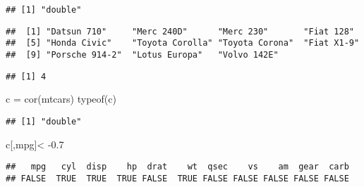 \documentclass[]{article}
\newenvironment{Shaded}{\begin{snugshade}}{\end{snugshade}}
\newcommand{\FloatTok}[1]{\textcolor[rgb]{0.00,0.00,0.81}{#1}}
\newcommand{\FunctionTok}[1]{\textcolor[rgb]{0.00,0.00,0.00}{#1}}
\newcommand{\NormalTok}[1]{#1}
\newcommand{\OtherTok}[1]{\textcolor[rgb]{0.56,0.35,0.01}{#1}}
\newcommand{\SpecialCharTok}[1]{\textcolor[rgb]{0.00,0.00,0.00}{#1}}
\newcommand{\StringTok}[1]{\textcolor[rgb]{0.31,0.60,0.02}{#1}}
\begin{document}
\begin{verbatim}
## [1] "double"
\end{verbatim}

\begin{Shaded}
\end{Shaded}

\begin{verbatim}
##  [1] "Datsun 710"     "Merc 240D"      "Merc 230"       "Fiat 128"      
##  [5] "Honda Civic"    "Toyota Corolla" "Toyota Corona"  "Fiat X1-9"     
##  [9] "Porsche 914-2"  "Lotus Europa"   "Volvo 142E"
\end{verbatim}

\begin{Shaded}
\end{Shaded}

\begin{verbatim}
## [1] 4
\end{verbatim}

\begin{Shaded}
\begin{Highlighting}[]
\NormalTok{c }\OtherTok{=} \FunctionTok{cor}\NormalTok{(mtcars)}
\FunctionTok{typeof}\NormalTok{(c)}
\end{Highlighting}
\end{Shaded}

\begin{verbatim}
## [1] "double"
\end{verbatim}

\begin{Shaded}
\begin{Highlighting}[]
\NormalTok{c[,}\StringTok{\textquotesingle{}mpg\textquotesingle{}}\NormalTok{]}\SpecialCharTok{\textless{}} \SpecialCharTok{{-}}\FloatTok{0.7}
\end{Highlighting}
\end{Shaded}

\begin{verbatim}
##   mpg   cyl  disp    hp  drat    wt  qsec    vs    am  gear  carb 
## FALSE  TRUE  TRUE  TRUE FALSE  TRUE FALSE FALSE FALSE FALSE FALSE
\end{verbatim}
\end{document}
